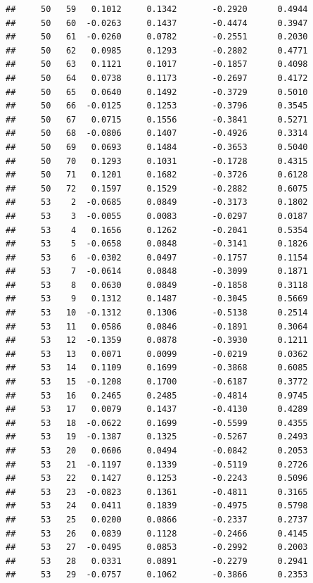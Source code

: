 \documentclass[
]{article}
\begin{document}
\begin{verbatim}
##     50   59   0.1012     0.1342       -0.2920      0.4944  
##     50   60  -0.0263     0.1437       -0.4474      0.3947  
##     50   61  -0.0260     0.0782       -0.2551      0.2030  
##     50   62   0.0985     0.1293       -0.2802      0.4771  
##     50   63   0.1121     0.1017       -0.1857      0.4098  
##     50   64   0.0738     0.1173       -0.2697      0.4172  
##     50   65   0.0640     0.1492       -0.3729      0.5010  
##     50   66  -0.0125     0.1253       -0.3796      0.3545  
##     50   67   0.0715     0.1556       -0.3841      0.5271  
##     50   68  -0.0806     0.1407       -0.4926      0.3314  
##     50   69   0.0693     0.1484       -0.3653      0.5040  
##     50   70   0.1293     0.1031       -0.1728      0.4315  
##     50   71   0.1201     0.1682       -0.3726      0.6128  
##     50   72   0.1597     0.1529       -0.2882      0.6075  
##     53    2  -0.0685     0.0849       -0.3173      0.1802  
##     53    3  -0.0055     0.0083       -0.0297      0.0187  
##     53    4   0.1656     0.1262       -0.2041      0.5354  
##     53    5  -0.0658     0.0848       -0.3141      0.1826  
##     53    6  -0.0302     0.0497       -0.1757      0.1154  
##     53    7  -0.0614     0.0848       -0.3099      0.1871  
##     53    8   0.0630     0.0849       -0.1858      0.3118  
##     53    9   0.1312     0.1487       -0.3045      0.5669  
##     53   10  -0.1312     0.1306       -0.5138      0.2514  
##     53   11   0.0586     0.0846       -0.1891      0.3064  
##     53   12  -0.1359     0.0878       -0.3930      0.1211  
##     53   13   0.0071     0.0099       -0.0219      0.0362  
##     53   14   0.1109     0.1699       -0.3868      0.6085  
##     53   15  -0.1208     0.1700       -0.6187      0.3772  
##     53   16   0.2465     0.2485       -0.4814      0.9745  
##     53   17   0.0079     0.1437       -0.4130      0.4289  
##     53   18  -0.0622     0.1699       -0.5599      0.4355  
##     53   19  -0.1387     0.1325       -0.5267      0.2493  
##     53   20   0.0606     0.0494       -0.0842      0.2053  
##     53   21  -0.1197     0.1339       -0.5119      0.2726  
##     53   22   0.1427     0.1253       -0.2243      0.5096  
##     53   23  -0.0823     0.1361       -0.4811      0.3165  
##     53   24   0.0411     0.1839       -0.4975      0.5798  
##     53   25   0.0200     0.0866       -0.2337      0.2737  
##     53   26   0.0839     0.1128       -0.2466      0.4145  
##     53   27  -0.0495     0.0853       -0.2992      0.2003  
##     53   28   0.0331     0.0891       -0.2279      0.2941  
##     53   29  -0.0757     0.1062       -0.3866      0.2353  

\end{verbatim}
\end{document}
